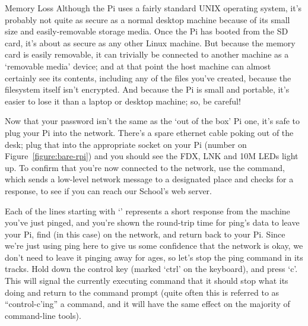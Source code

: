 \begin{danger}{Memory Loss} 
Although the Pi uses a fairly standard UNIX operating system, it's probably not quite as secure as a normal desktop machine because of its small size and easily-removable storage media. Once the Pi has booted from the SD card, it's about as secure as any other Linux machine. But because the memory card is easily removable, it can trivially be connected to another machine as a `removable media' device; and at that point the host machine can almost certainly see its contents, including any of the files you've created, because the filesystem itself isn't encrypted. And because the Pi is small and portable, it's easier to lose it than a laptop or desktop machine; so, be careful!
\end{danger}

Now that your password isn't the same as the `out of the box' Pi one, it's safe to plug your Pi into the network. There's a spare ethernet cable poking out of the desk; plug that into the appropriate socket on your Pi (number  on Figure~\ref{figure:bare-rpi}) and you should see the FDX, LNK and 10M LEDs light up. To confirm that you're now connected to the network, use the  command, which sends a low-level network message to a designated place and checks for a response, to see if you can reach our School's web server. 


Each of the lines starting with `' represents a short response from the machine you've just pinged, and you're shown the round-trip time for ping's data to leave your Pi, find (in this case)  on the network, and return back to your Pi. Since we're just using ping here to give us some confidence that the network is okay, we don't need to leave it pinging away for ages, so let's stop the ping command in its tracks. Hold down the control key (marked `ctrl' on the keyboard), and press `c'. This will signal the currently executing command that it should stop what its doing and return to the command prompt (quite often this is referred to as ``control-c'ing'' a command, and it will have the same effect on the majority of command-line tools).

